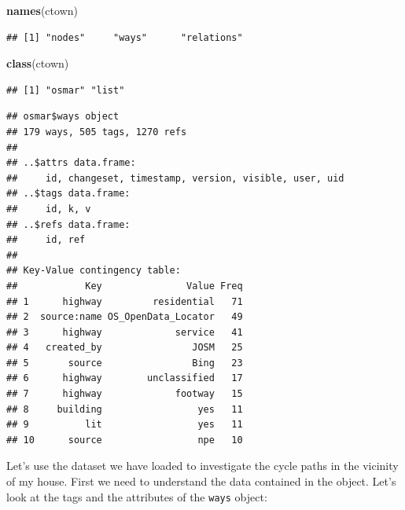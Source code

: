 \documentclass[]{article}
\newenvironment{Shaded}{}{}
\newcommand{\KeywordTok}[1]{\textcolor[rgb]{0.00,0.44,0.13}{\textbf{{#1}}}}
\newcommand{\NormalTok}[1]{{#1}}
\begin{document}
\begin{Shaded}
\begin{Highlighting}[]
\KeywordTok{names}\NormalTok{(ctown)}
\end{Highlighting}
\end{Shaded}
\begin{verbatim}
## [1] "nodes"     "ways"      "relations"
\end{verbatim}
\begin{Shaded}
\begin{Highlighting}[]
\KeywordTok{class}\NormalTok{(ctown)}
\end{Highlighting}
\end{Shaded}
\begin{verbatim}
## [1] "osmar" "list"
\end{verbatim}
\begin{Shaded}
\end{Shaded}
\begin{verbatim}
## osmar$ways object
## 179 ways, 505 tags, 1270 refs 
## 
## ..$attrs data.frame: 
##     id, changeset, timestamp, version, visible, user, uid 
## ..$tags data.frame: 
##     id, k, v 
## ..$refs data.frame: 
##     id, ref 
##  
## Key-Value contingency table:
##            Key               Value Freq
## 1      highway         residential   71
## 2  source:name OS_OpenData_Locator   49
## 3      highway             service   41
## 4   created_by                JOSM   25
## 5       source                Bing   23
## 6      highway        unclassified   17
## 7      highway             footway   15
## 8     building                 yes   11
## 9          lit                 yes   11
## 10      source                 npe   10
\end{verbatim}
Let's use the dataset we have loaded to investigate the cycle paths in
the vicinity of my house. First we need to understand the data contained
in the object. Let's look at the tags and the attributes of the
\texttt{ways} object:
\end{document}
